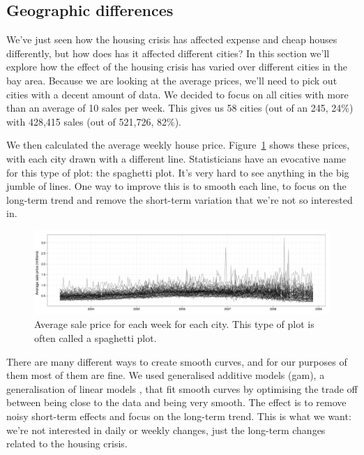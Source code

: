 \documentclass[oneside]{article}
\begin{document}
\subsection{Geographic differences}

We've just seen how the housing crisis has affected expense and cheap houses differently, but how does has it affected different cities?  In this section we'll explore how the effect of the housing crisis has varied over different cities in the bay area.  Because we are looking at the average prices, we'll need to pick out cities with a decent amount of data.  We decided to focus on all cities with more than an average of 10 sales per week. This gives us 58 cities (out of an 245, 24\%) with 428,415 sales (out of 521,726, 82\%).  

We then calculated the average weekly house price. Figure~\ref{fig:spaghetti} shows these prices, with each city drawn with a different line.  Statisticians have an evocative name for this type of plot: the spaghetti plot.  It's very hard to see anything in the big jumble of lines.  One way to improve this is to smooth each line, to focus on the long-term trend and remove the short-term variation that we're not so interested in. 

\begin{figure}[htbp]
  \centering
    \includegraphics[width=0.9\linewidth]{cities-price}
  \caption{Average sale price for each week for each city.  This type of plot is often called a spaghetti plot.}
  \label{fig:spaghetti}
\end{figure}

There are many different ways to create smooth curves, and for our purposes of them most of them are fine.  We used generalised additive models ({\sc gam}), a generalisation of linear models \citep{wood:2006}, that fit smooth curves by optimising the trade off between being close to the data and being very smooth. The effect is to remove noisy short-term effects and focus on the long-term trend.  This is what we want: we're not interested in daily or weekly changes, just the long-term changes related to the housing crisis.
\end{document}
